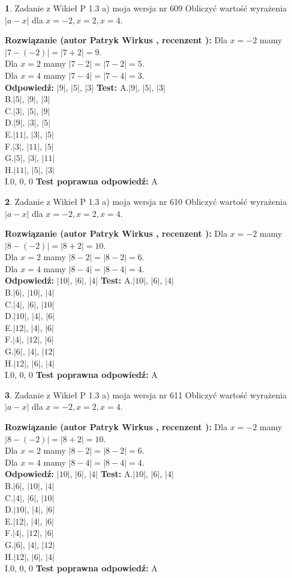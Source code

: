 \documentclass[12pt, a4paper]{article}
\theoremstyle{definition} %
\newtheorem{zad}{}
\newcommand{\zadStart}[1]{\begin{zad}#1\newline}
\newcommand{\zadStop}{\end{zad}}
\newcommand{\rozwStart}[2]{\noindent \textbf{Rozwiązanie (autor #1 , recenzent #2): }\newline}
\newcommand{\rozwStop}{\newline}
\newcommand{\odpStart}{\noindent \textbf{Odpowiedź:}\newline}
\newcommand{\odpStop}{\newline}
\newcommand{\testStart}{\noindent \textbf{Test:}\newline}
\newcommand{\testStop}{\newline}
\newcommand{\kluczStart}{\noindent \textbf{Test poprawna odpowiedź:}\newline}
\newcommand{\kluczStop}{\newline}
\begin{document}
\zadStart{Zadanie z Wikieł P 1.3 a) moja wersja nr 609}
Obliczyć wartość wyrażenia $|a - x|$ dla $x=-2,x=2,x=4$.
\zadStop
\rozwStart{Patryk Wirkus}{}
Dla $x = -2$ mamy $|7 - (-2)| = |7 + 2| = 9$.\\
Dla $x = 2$ mamy $|7 - 2| = |7 - 2| = 5$.\\
Dla $x = 4$ mamy $|7 - 4| = |7 - 4| = 3$.\\
\rozwStop
\odpStart
$|9|$, $|5|$, $|3|$
\odpStop
\testStart
A.$|9|$, $|5|$, $|3|$\\
B.$|5|$, $|9|$, $|3|$\\
C.$|3|$, $|5|$, $|9|$\\
D.$|9|$, $|3|$, $|5|$\\
E.$|11|$, $|3|$, $|5|$\\
F.$|3|$, $|11|$, $|5|$\\
G.$|5|$, $|3|$, $|11|$\\
H.$|11|$, $|5|$, $|3|$\\
I.$0$, $0$, $0$
\testStop
\kluczStart
A
\kluczStop



\zadStart{Zadanie z Wikieł P 1.3 a) moja wersja nr 610}
Obliczyć wartość wyrażenia $|a - x|$ dla $x=-2,x=2,x=4$.
\zadStop
\rozwStart{Patryk Wirkus}{}
Dla $x = -2$ mamy $|8 - (-2)| = |8 + 2| = 10$.\\
Dla $x = 2$ mamy $|8 - 2| = |8 - 2| = 6$.\\
Dla $x = 4$ mamy $|8 - 4| = |8 - 4| = 4$.\\
\rozwStop
\odpStart
$|10|$, $|6|$, $|4|$
\odpStop
\testStart
A.$|10|$, $|6|$, $|4|$\\
B.$|6|$, $|10|$, $|4|$\\
C.$|4|$, $|6|$, $|10|$\\
D.$|10|$, $|4|$, $|6|$\\
E.$|12|$, $|4|$, $|6|$\\
F.$|4|$, $|12|$, $|6|$\\
G.$|6|$, $|4|$, $|12|$\\
H.$|12|$, $|6|$, $|4|$\\
I.$0$, $0$, $0$
\testStop
\kluczStart
A
\kluczStop



\zadStart{Zadanie z Wikieł P 1.3 a) moja wersja nr 611}
Obliczyć wartość wyrażenia $|a - x|$ dla $x=-2,x=2,x=4$.
\zadStop
\rozwStart{Patryk Wirkus}{}
Dla $x = -2$ mamy $|8 - (-2)| = |8 + 2| = 10$.\\
Dla $x = 2$ mamy $|8 - 2| = |8 - 2| = 6$.\\
Dla $x = 4$ mamy $|8 - 4| = |8 - 4| = 4$.\\
\rozwStop
\odpStart
$|10|$, $|6|$, $|4|$
\odpStop
\testStart
A.$|10|$, $|6|$, $|4|$\\
B.$|6|$, $|10|$, $|4|$\\
C.$|4|$, $|6|$, $|10|$\\
D.$|10|$, $|4|$, $|6|$\\
E.$|12|$, $|4|$, $|6|$\\
F.$|4|$, $|12|$, $|6|$\\
G.$|6|$, $|4|$, $|12|$\\
H.$|12|$, $|6|$, $|4|$\\
I.$0$, $0$, $0$
\testStop
\kluczStart
A
\kluczStop
\end{document}
